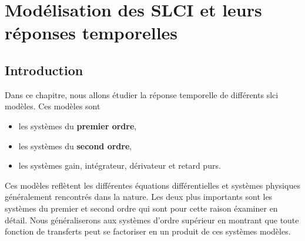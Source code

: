 \chapter[Modélisation des SLCI]
        {Modélisation des SLCI\label{chap-model} et leurs réponses temporelles}
\minitoc
\newpage
\section{Introduction}

Dans ce chapitre, nous allons étudier la réponse 
temporelle de différents \gls{slci} modèles. Ces modèles sont 
\begin{itemize}
    \item les systèmes du \textbf{premier ordre},
    \item les systèmes du \textbf{second ordre},
    \item les systèmes gain, intégrateur, dérivateur et retard purs.
\end{itemize}
Ces modèles reflètent les différentes équations différentielles et 
systèmes physiques généralement rencontrés dans la nature.
Les deux plus importants sont les systèmes du premier et second ordre 
qui sont pour cette raison éxaminer en détail. 
Nous généraliserons aux systèmes d'ordre supérieur en montrant 
que toute fonction de transferts peut se factoriser en un produit
de ces systèmes modèles.

